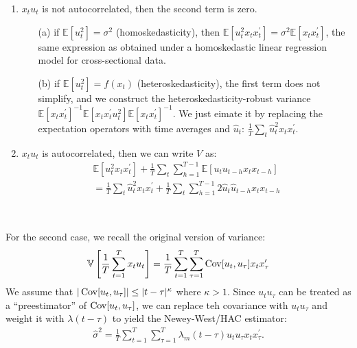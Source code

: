 \begin{enumerate}
    \item $x_t u_t$ is not autocorrelated, then the second term is zero.
        \begin{enumerate}
            \item[(a)] if $\mathbb{E}[u_t^2] = \sigma^2$ (homoskedasticity), then $\mathbb{E}[u_t^2 x_t x_t^{\prime}] = \sigma^2 \mathbb{E}[x_t x_t^{\prime}]$,
            the same expression as obtained under a homoskedastic linear regression model for cross-sectional data.
            \item[(b)] if $\mathbb{E}[u_t^2] = f(x_t)$ (heteroskedasticity), the first term does not simplify,
            and we construct the heteroskedasticity-robust variance $\mathbb{E}[x_t x_t^{\prime}]^{-1} \mathbb{E}[x_t x_t^{\prime} u_t^2] \mathbb{E}[x_t x_t^{\prime}]^{-1}$.
            We just eimate it by replacing the expectation operators with time averages and $\hat{u}_t$: $\frac{1}{T} \sum_{t} \hat{u}_t^2 x_t x_t^{\prime}.$
        \end{enumerate}
    \item $x_t u_t$ is autocorrelated, then we can write $V$ as:
        \begin{gather*}
            \mathbb{E}[u_t^2 x_t x_t^{\prime}] + \frac{1}{T} \sum_{t} \sum_{h=1}^{T-1} \mathbb{E}[u_t u_{t-h} x_t x_{t-h}] \\
            = \frac{1}{T} \sum_{t} \hat{u}_t^2 x_t x_t^{\prime} + \frac{1}{T} \sum_{t} \sum_{h=1}^{T-1} 2 \hat{u}_t \hat{u}_{t-h} x_t x_{t-h}  
        \end{gather*}
\end{enumerate}

\begin{remark}
    \

    For the second case, we recall the original version of variance:
    \begin{gather*}
        \mathbb{V}\left[\frac{1}{T} \sum_{t=1}^{T} x_t u_t\right] = \frac{1}{T} \sum_{t=1}^{T} \sum_{\tau=1}^{T} \operatorname{Cov}[u_t, u_{\tau}] x_t x_{\tau}^{\prime}  
    \end{gather*}
    We assume that $\vert \operatorname{Cov}[u_t, u_{\tau}] \vert \leq \vert t-\tau \vert^{\kappa} $ where $\kappa>1$.
    Since $u_t u_{\tau}$ can be treated as a ``preestimator'' of $\operatorname{Cov}[u_t, u_{\tau}]$,
    we can replace teh covariance with $u_t u_{\tau}$ and weight it with $\lambda(t-\tau)$ to yield the Newey-West/HAC estimator:
    \begin{gather*}
        \hat{\sigma}^2 = \frac{1}{T} \sum_{t=1}^{T} \sum_{\tau=1}^{T} \lambda_m(t-\tau) u_t u_{\tau} x_t x_{\tau}^{\prime}.
    \end{gather*}
\end{remark}
